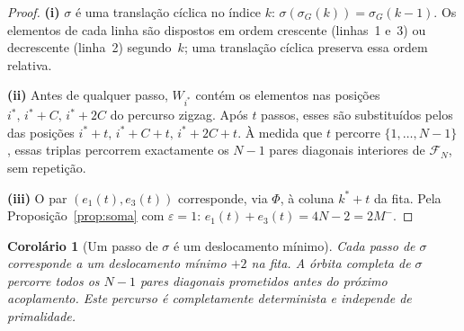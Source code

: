 \documentclass[12pt, a4paper]{article}
\theoremstyle{plain}
\newtheorem{corollary}[theorem]{Corolário}
\theoremstyle{definition}
\theoremstyle{remark}
\begin{document}
	\begin{proof}
		\textbf{(i)}  $\sigma$ é uma translação cíclica no índice $k$:
		$\sigma(\sigma_G(k))=\sigma_G(k-1)$.  Os elementos de cada linha
		são dispostos em ordem crescente (linhas~1 e~3) ou decrescente
		(linha~2) segundo~$k$; uma translação cíclica preserva essa ordem
		relativa.
		
		\textbf{(ii)}  Antes de qualquer passo, $W_{i^*}$ contém os
		elementos nas posições $i^*,\,i^*+C,\,i^*+2C$ do percurso zigzag.
		Após $t$ passos, esses são substituídos pelos das posições
		$i^*+t,\,i^*+C+t,\,i^*+2C+t$.  À medida que $t$ percorre
		$\{1,\ldots,N-1\}$, essas triplas percorrem exactamente os $N-1$
		pares diagonais interiores de $\mathcal{F}_N$, sem repetição.
		
		\textbf{(iii)}  O par $(e_1(t),e_3(t))$ corresponde, via $\Phi$,
		à coluna $k^*+t$ da fita.  Pela Proposição~\ref{prop:soma} com
		$\varepsilon=1$: $e_1(t)+e_3(t)=4N-2=2M^-$.
	\end{proof}
	
	\begin{corollary}[Um passo de $\sigma$ é um deslocamento mínimo]
		\label{cor:sigma-desloc}
		Cada passo de $\sigma$ corresponde a um deslocamento mínimo $+2$
		na fita.  A órbita completa de $\sigma$ percorre todos os $N-1$
		pares diagonais prometidos antes do próximo acoplamento.  Este
		percurso é completamente determinista e independe de primalidade.
	\end{corollary}
	
\end{document}
